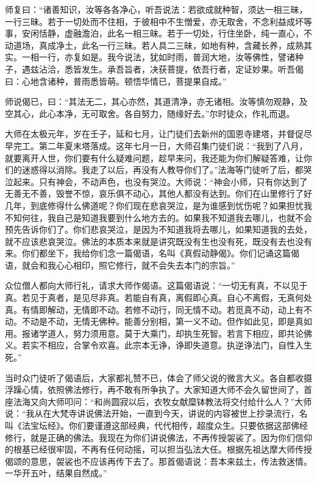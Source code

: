 \documentclass[12pt,twoside,openany]{book}
\newcommand{\kai}[1]{{\CJKfamily{kai}#1}}
\begin{document}
师复曰：“诸善知识，汝等各各净心，听吾说法：若欲成就种智，须达一相三昧，一行三昧。若于一切处而不住相，于彼相中不生憎爱，亦无取舍，不念利益成坏等事，安闲恬静，虚融澹泊，此名一相三昧。若于一切处，行住坐卧，纯一直心，不动道场，真成净土，此名一行三昧。若人具二三昧，如地有种，含藏长养，成熟其实。一相一行，亦复如是。我今说法，犹如时雨，普润大地，汝等佛性，譬诸种子，遇兹沾洽，悉皆发生。承吾旨者，决获菩提，依吾行者，定证妙果。听吾偈曰：心地含诸种，普雨悉皆萌。顿悟华情已，菩提果自成。”

师说偈已，曰：“其法无二，其心亦然，其道清净，亦无诸相。汝等慎勿观静，及空其心，此心本净，无可取舍。各自努力，随缘好去。”尔时徒众，作礼而退。

\kai{大师在太极元年，岁在壬子，延和七月，让门徒们去新州的国恩寺建塔，并督促尽早完工。第二年夏末塔落成。这年七月一日，大师召集门徒们说：“我到了八月，就要离开人世，你们要有什么疑难问题，趁早来问，我还能为你们解疑答难，让你们的迷惑得以消除。我走了以后，再没有人教导你们了。”法海等门徒听了后，都哭泣起来。只有神会，不动声色，也没有哭泣。大师说：“神会小师，只有你达到了无善无不善，毁誉不惊，哀乐俱不动心，其他人都没有达到。你们在山里修行了好几年，到底修得什么佛道呢？你们现在悲哀哭泣，是为谁感到忧伤呢？如果担忧我不知何往，我自己是知道我要到什么地方去的。如果我不知道我去哪儿，也就不会预先告诉你们了。你们悲哀哭泣，是因为不知道我将去哪儿，如果知道我的去处，就不应该悲哀哭泣。佛法的本质本来就是讲究既没有生也没有死，既没有去也没有来。你们都坐下，我给你们念一篇偈语，名叫《真假动静偈》。你们记诵这篇偈语，就会和我心心相印，照它修行，就不会失去本门的宗旨。”
	
众位僧人都向大师行礼，请求大师作偈语。这篇偈语说：“一切无有真，不以见于真。若见于真者，是见尽非真。若能自有真，离假即心真。自心不离假，无真何处真。有情即解动，无情即不动。若修不动行，同无情不动。若觅真不动，动上有不动。不动是不动，无情无佛种。能善分别相，第一义不动。但作如此见，即是真如用。报诸学道人，努力须用意。莫于大乘门，却执生死智。若言下相应，即共论佛义。若实不相应，合掌令欢喜。此宗本无诤，诤即失道意。执逆诤法门，自性入生死。”

当时众门徒听了偈语后，大家都礼赞不已，体会了师父说的微言大义。各自都收摄浮躁心情，依照佛法修行，再不敢有所争执了。大家知道大师不会久留世间了，首座法海又向大师叩问：“和尚圆寂以后，衣牧女献糜钵教法将交付给什么人？”大师说：“我从在大梵寺讲说佛法开始，一直到今天，讲说的内容被世上抄录流行，名叫《法宝坛经》。你们要谨遵这部经典，代代相传，超度众生。只要依据这部佛经修行，就是正确的佛法。我现在为你们讲说佛法，不再传授袈裟了。因为你们信仰的根基已经很牢固，不再有任何动摇，可以担当弘法大任。根据先祖达摩大师传授偈颂的意思，袈裟也不应该再传下去了。那首偈语说：吾本来兹土，传法救迷情。一华开五叶，结果自然成。”

}
\end{document}
